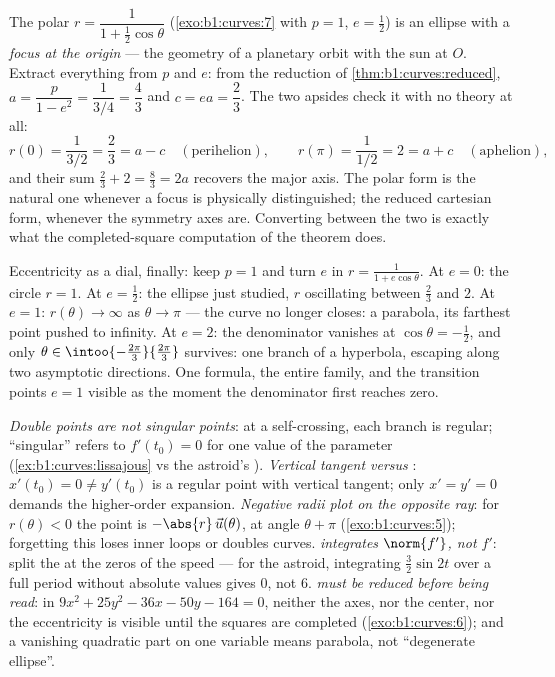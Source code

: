 \begin{example}
\label{ex:b1:curves:orbit}
The polar  $r = \dfrac{1}{1 + \frac12\cos\theta}$
(\cref{exo:b1:curves:7} with $p = 1$, $e = \frac12$) is an
ellipse with a \emph{focus at the origin} --- the geometry of a
planetary orbit with the sun at $O$. Extract everything from
$p$ and $e$: from the reduction of
\cref{thm:b1:curves:reduced}, $a = \dfrac{p}{1 - e^2} =
\dfrac{1}{3/4} = \dfrac43$ and $c = ea = \dfrac23$. The two
apsides check it with no theory at all:
\[
r(0) = \frac{1}{3/2} = \frac23 = a - c
\quad (\text{perihelion}),
\qquad
r(\pi) = \frac{1}{1/2} = 2 = a + c
\quad (\text{aphelion}),
\]
and their sum $\frac23 + 2 = \frac83 = 2a$ recovers the major
axis. The polar form is the natural one whenever a focus is
physically distinguished; the reduced cartesian form, whenever
the symmetry axes are. Converting between the two is exactly
what the completed-square computation of the theorem does.

Eccentricity as a dial, finally: keep $p = 1$ and turn $e$ in $r
= \frac{1}{1 + e\cos\theta}$. At $e = 0$: the circle $r = 1$. At
$e = \frac12$: the ellipse just studied, $r$ oscillating between
$\frac23$ and $2$. At $e = 1$: $r(\theta) \to \infty$ as $\theta
\to \pi$ --- the curve no longer closes: a parabola, its
farthest point pushed to infinity. At $e = 2$: the denominator
vanishes at $\cos\theta = -\frac12$, and only $\theta \in
\intoo{-\frac{2\pi}3}{\frac{2\pi}3}$ survives: one branch of a
hyperbola, escaping along two asymptotic directions. One
formula, the entire  family, and the transition points $e =
1$ visible as the moment the denominator first reaches zero.
\end{example}

\begin{remark}
\label{rem:b1:curves:pitfalls}
\emph{Double points are not singular points}: at a
self-crossing, each branch is regular; ``singular'' refers to
$f'(t_0) = 0$ for one value of the parameter
(\cref{ex:b1:curves:lissajous} vs the astroid's ).
\emph{Vertical tangent versus }: $x'(t_0) = 0 \neq y'(t_0)$
is a regular point with vertical tangent; only $x' = y' = 0$
demands the higher-order expansion.
\emph{Negative radii plot on the opposite ray}: for $r(\theta) <
0$ the point is $-\abs{r}\,\vec u(\theta)$, at angle $\theta +
\pi$ (\cref{exo:b1:curves:5}); forgetting this loses inner loops
or doubles curves.
\emph{ integrates $\norm{f'}$, not $f'$}: split the
 at the zeros of the speed --- for the astroid,
integrating $\frac32\sin 2t$ over a full period without absolute
values gives $0$, not $6$.
\emph{ must be reduced before being read}: in $9x^2 +
25y^2 - 36x - 50y - 164 = 0$, neither the axes, nor the center,
nor the eccentricity is visible until the squares are completed
(\cref{exo:b1:curves:6}); and a vanishing quadratic part on one
variable means parabola, not ``degenerate ellipse''.
\end{remark}

